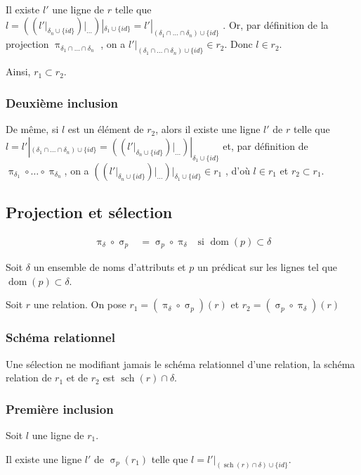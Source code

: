 \documentclass[french]{article}
\DeclareMathOperator{\proj}{\pi}
\DeclareMathOperator{\sel}{\sigma}
\DeclareMathOperator{\dom}{dom}
\DeclareMathOperator{\s}{sch}
\newcommand{\projDelta}{\proj_{\delta}}
\newcommand{\selP}{\sel_p}
\newcommand{\cip}{\cup \{id\}}
\newcommand{\intro}[2]{Soit $r$ une relation. On pose $r_1 = (#1)(r) $ et $r_2 = (#2)(r) $}
\begin{document}
Il existe $l'$ une ligne de $r$ telle que
$
l = {\left( 
	 {\left(    
	  l'|_{\delta_n \cip} 
	 \right)} |_{\dots }
	\right)} |_{\delta_1 \cip}
= l'|_{(\delta_1 \cap \dots \cap \delta_n) \cip}
$
.
Or, par définition de la projection $\proj_{\delta_1 \cap \dots \cap \delta_n}$ ,
on a $l' |_{(\delta_1 \cap \dots \cap \delta_n) \cip} \in r_2$.
Donc $l \in r_2$.

Ainsi, $r_1 \subset r_2$.

\subsubsection*{Deuxième inclusion}
De même, si $l$ est un élément de $r_2$,
alors il existe une ligne $l'$ de $r$ telle que
$l = l' |_{(\delta_1 \cap \dots \cap \delta_n) \cip} = 
 {\left( 
	{\left(    
		l'|_{\delta_n \cip} 
		\right)} |_{\dots }
	\right)} |_{\delta_1 \cip}
$
et, par définition de 
$\proj_{\delta_1}\circ \dots \circ \proj_{\delta_n}$, on a
$
{\left( 
	{\left(    
		l'|_{\delta_n \cip} 
		\right)} |_{\dots }
	\right)} |_{\delta_1 \cip}
\in r_1
$ 
, d'où $l \in r_1$ et $r_2 \subset r_1$.

\subsection*{Projection et sélection}
\begin{align}
\projDelta \circ \selP
& = \selP \circ \projDelta
& \text{si $\dom(p) \subset \delta$}
\end{align}

Soit $\delta$ un ensemble de noms d'attributs
et $p$ un prédicat sur les lignes tel que
$\dom(p) \subset \delta$.

\intro{\projDelta \circ \selP}{\selP \circ \projDelta}

\subsubsection*{Schéma relationnel}
Une sélection ne modifiant jamais le schéma relationnel
d'une relation,
la schéma relation de $r_1$ et de $r_2$ est
$\s(r) \cap \delta$.

\subsubsection*{Première inclusion}
Soit $l$ une ligne de $r_1$.

Il existe une ligne $l'$ de $\selP(r_1)$
telle que $l = l'|_{(\s(r)\cap \delta) \cip}$.
\end{document}

